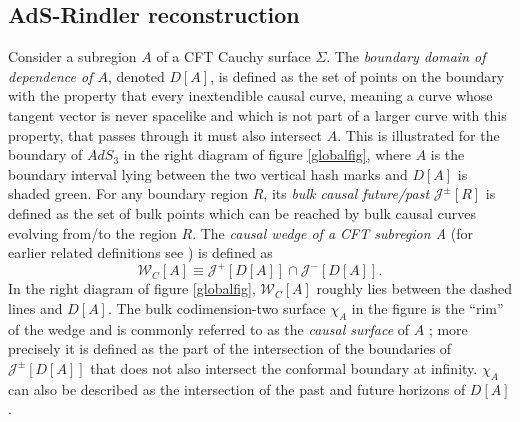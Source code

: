 \documentclass[11pt]{article}
\newcommand{\be}{\begin{equation}}
\newcommand{\ee}{\end{equation}}
\newcommand{\W}{\mathcal{W}}
\newcommand{\J}{\mathcal{J}}
\begin{document}
\subsection{AdS-Rindler reconstruction}\label{rindsec}
Consider a subregion $A$ of a CFT Cauchy surface $\Sigma$.  The \textit{boundary domain of dependence of $A$}, denoted $D[A]$, is defined as the set of points on the boundary with the property that every inextendible causal curve, meaning a curve whose tangent vector is never spacelike and which is not part of a larger curve with this property, that passes through it must also intersect $A$.  This is illustrated for the boundary of $AdS_3$ in the right diagram of figure \ref{globalfig}, where $A$ is the boundary interval lying between the two vertical hash marks and $D[A]$ is shaded green.  For any boundary region $R$, its \textit{bulk causal future/past} $\J^{\pm}[R]$ is defined as the set of bulk points which can be reached by bulk causal curves evolving from/to the region $R$.  The \textit{causal wedge of a CFT subregion A} \cite{Hubeny:2012wa} (for earlier related definitions see \cite{Bousso:2001cf}) is defined as
\be
\W_C[A]\equiv \J^+[D[A]]\cap\J^{-}[D[A]].
\ee
In the right diagram of figure \ref{globalfig}, $\W_C[A]$ roughly lies between the dashed lines and $D[A]$. The bulk codimension-two surface $\chi_A$ in the figure is the ``rim'' of the wedge and is commonly referred to as the \emph{causal surface} of $A$ \cite{Hubeny:2012wa}; more precisely it is defined as the part of the intersection of the boundaries of $\J^\pm[D[A]]$ that does not also intersect the conformal boundary at infinity.  $\chi_A$ can also be described as the intersection of the past and future horizons of $D[A]$.
\end{document}

